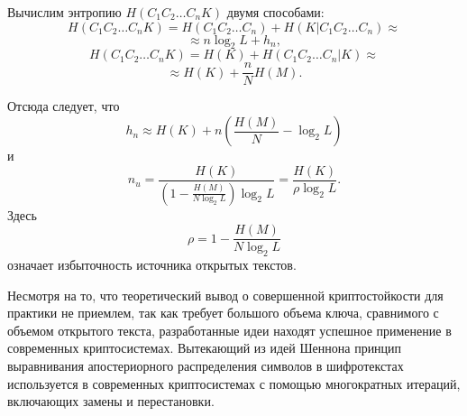 Вычислим энтропию $H(C_1 C_2 \dots C_n K)$ двумя способами:
    \[ H(C_1 C_2 \dots C_n K) = H(C_1 C_2 \dots C_n) + H(K | C_1 C_2 \dots C_n) \approx \]
        \[ \approx n \log_2 L + h_n, \]
    \[H(C_1 C_2 \dots C_n K) = H(K) + H(C_1 C_2 \dots C_n | K) \approx \]
        \[ \approx H(K) + \frac{n}{N} H(M). \]

Отсюда следует, что
    \[ h_n \approx H(K) + n \left( \frac{H(M)}{N} - \log_2 L \right) \]
и
    \[ n_u = \frac{H(K)}{ \left( 1 - \frac{H(M)}{N \log_2 L} \right) \log_2 L} = \frac{H(K)}{\rho \log_2 L}. \]
Здесь
    \[ \rho = 1 - \frac{H(M)}{N \log_2 L} \]
означает избыточность источника открытых текстов.


Несмотря на то, что теоретический вывод о совершенной криптостойкости для практики не приемлем, так как требует большого объема ключа, сравнимого с объемом открытого текста, разработанные идеи находят успешное применение в современных криптосистемах. Вытекающий из идей Шеннона принцип  выравнивания апостериорного распределения символов в шифротекстах используется в современных криптосистемах с помощью многократных итераций, включающих замены и перестановки.
